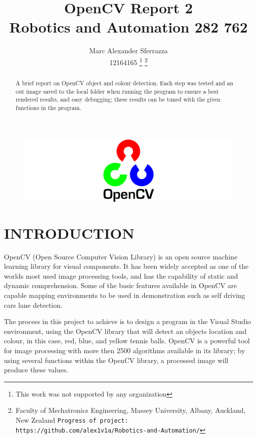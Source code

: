 \documentclass[a4paper, 10pt]{article}
\title{\LARGE \bf OpenCV Report 2\\Robotics and Automation  282 762}
\author{Marc Alexander Sferrazza \\ 12164165
\thanks{This work was not supported by any organization}
\thanks{Faculty of Mechatronics Engineering, Massey University, Albany, Auckland, New Zealand
        {\tt\small Progress of project: https://github.com/alex1v1a/Robotics-and-Automation/} } }
\begin{document}
\maketitle

\begin{figure}[H]
  \includegraphics[width=\linewidth]{images/opencv}
  \label{fig:opencv}
\end{figure}

\thispagestyle{empty}
\pagestyle{plain}



\begin{abstract}

A brief report on OpenCV object and colour detection. Each step was tested and an out image saved to the local folder when running the program to ensure a best rendered results, and easy debugging; these results can be tuned with the given functions in the program.

\end{abstract}


\clearpage
\tableofcontents
\thispagestyle{empty}
\clearpage


\setcounter{page}{1}

\section{INTRODUCTION}

OpenCV (Open Source Computer Vision Library) is an open source machine learning library for visual components. It has been widely accepted as one of the worlds most used image processing tools, and has the capability of static and dynamic comprehension. Some of the basic features available in OpenCV are capable mapping environments to be used in demonstration such as self driving cars lane detection. 

The process in this project to achieve is to design a program in the Visual Studio environment, using the OpenCV library that will detect an objects location and colour, in this case, red, blue, and yellow tennis balls. OpenCV is a powerful tool for image processing with more then 2500 algorithms available in its library; by using several functions within the OpenCV library, a processed image will produce these values. 
\end{document}
